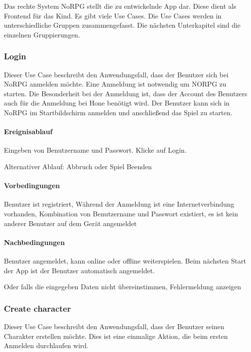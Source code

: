 		Das rechte System NoRPG stellt die zu entwickelnde App dar. Diese dient als Frontend für das Kind. Es gibt viele Use Cases. Die Use Cases werden in unterschiedliche Gruppen zusammengefasst. Die nächsten Unterkapitel sind die einzelnen Gruppierungen.
	
		\subsubsection{Login}
			Dieser Use Case beschreibt den Anwendungsfall, dass der Benutzer sich bei NoRPG anmelden möchte. Eine Anmeldung ist notwendig um NORPG zu starten. Die Besonderheit bei der Anmeldung  ist, dass der Account des Benutzers auch für die Anmeldung bei Hone benötigt wird. Der Benutzer kann sich in NoRPG im Startbildschirm anmelden und anschließend das Spiel zu starten.
			
			\paragraph{Ereignisablauf}
				Eingeben von Benutzername und Passwort.	Klicke auf Login.
			
				Alternativer Ablauf: Abbruch oder Spiel Beenden
			
			\paragraph{Vorbedingungen}
				Benutzer ist registriert, Während der Anmeldung ist eine Internetverbindung vorhanden, Kombination von Benutzername und Passwort existiert, es ist kein anderer Benutzer auf dem Gerät angemeldet
			
			\paragraph{Nachbedingungen}
				Benutzer angemeldet, kann online oder offline weiterspielen. Beim nächsten Start der App ist der Benutzer automatisch angemeldet.
			
				Oder falls die eingegeben Daten nicht übereinstimmen, Fehlermeldung anzeigen
	
		\subsubsection{Create character}
			Dieser Use Case beschreibt den Anwendungsfall, dass der Benutzer seinen Charakter erstellen möchte. Dies ist eine einmalige Aktion, die beim ersten Anmelden durchlaufen wird. 
			
